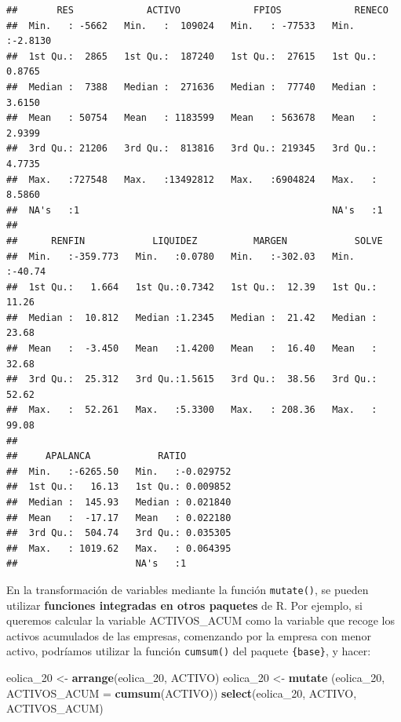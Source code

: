 \documentclass[
]{book}
\newenvironment{Shaded}{\begin{snugshade}}{\end{snugshade}}
\newcommand{\AttributeTok}[1]{\textcolor[rgb]{0.13,0.29,0.53}{#1}}
\newcommand{\FunctionTok}[1]{\textcolor[rgb]{0.13,0.29,0.53}{\textbf{#1}}}
\newcommand{\NormalTok}[1]{#1}
\newcommand{\OtherTok}[1]{\textcolor[rgb]{0.56,0.35,0.01}{#1}}
\begin{document}
\begin{verbatim}
##       RES             ACTIVO             FPIOS             RENECO       
##  Min.   : -5662   Min.   :  109024   Min.   : -77533   Min.   :-2.8130  
##  1st Qu.:  2865   1st Qu.:  187240   1st Qu.:  27615   1st Qu.: 0.8765  
##  Median :  7388   Median :  271636   Median :  77740   Median : 3.6150  
##  Mean   : 50754   Mean   : 1183599   Mean   : 563678   Mean   : 2.9399  
##  3rd Qu.: 21206   3rd Qu.:  813816   3rd Qu.: 219345   3rd Qu.: 4.7735  
##  Max.   :727548   Max.   :13492812   Max.   :6904824   Max.   : 8.5860  
##  NA's   :1                                             NA's   :1        
## 
##      RENFIN            LIQUIDEZ          MARGEN            SOLVE       
##  Min.   :-359.773   Min.   :0.0780   Min.   :-302.03   Min.   :-40.74  
##  1st Qu.:   1.664   1st Qu.:0.7342   1st Qu.:  12.39   1st Qu.: 11.26  
##  Median :  10.812   Median :1.2345   Median :  21.42   Median : 23.68  
##  Mean   :  -3.450   Mean   :1.4200   Mean   :  16.40   Mean   : 32.68  
##  3rd Qu.:  25.312   3rd Qu.:1.5615   3rd Qu.:  38.56   3rd Qu.: 52.62  
##  Max.   :  52.261   Max.   :5.3300   Max.   : 208.36   Max.   : 99.08  
## 
##     APALANCA            RATIO          
##  Min.   :-6265.50   Min.   :-0.029752  
##  1st Qu.:   16.13   1st Qu.: 0.009852  
##  Median :  145.93   Median : 0.021840  
##  Mean   :  -17.17   Mean   : 0.022180  
##  3rd Qu.:  504.74   3rd Qu.: 0.035305  
##  Max.   : 1019.62   Max.   : 0.064395  
##                     NA's   :1
\end{verbatim}

En la transformación de variables mediante la función \texttt{mutate()}, se pueden utilizar \textbf{funciones integradas en otros paquetes} de R. Por ejemplo, si queremos calcular la variable ACTIVOS\_ACUM como la variable que recoge los activos acumulados de las empresas, comenzando por la empresa con menor activo, podríamos utilizar la función \texttt{cumsum()} del paquete \texttt{\{base\}}, y hacer:

\begin{Shaded}
\begin{Highlighting}[]
\NormalTok{eolica\_20 }\OtherTok{\textless{}{-}} \FunctionTok{arrange}\NormalTok{(eolica\_20, ACTIVO)}
\NormalTok{eolica\_20 }\OtherTok{\textless{}{-}} \FunctionTok{mutate}\NormalTok{ (eolica\_20, }\AttributeTok{ACTIVOS\_ACUM =} \FunctionTok{cumsum}\NormalTok{(ACTIVO))}
\FunctionTok{select}\NormalTok{(eolica\_20, ACTIVO, ACTIVOS\_ACUM)}
\end{Highlighting}
\end{Shaded}
\end{document}
